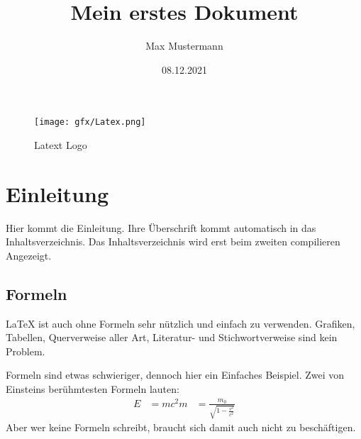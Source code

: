 \documentclass[a4paper,10pt]{scrartcl}
\title{Mein erstes Dokument}
\author{Max Mustermann}
\date{08.12.2021}
\begin{document}
\maketitle

\begin{figure}[h]
\begin{center}
\texttt{[image: gfx/Latex.png]}
\caption{Latext Logo}
\label{latex_logo}
\end{center}
\end{figure}

\tableofcontents


\section{Einleitung}
Hier kommt die Einleitung. Ihre Überschrift kommt automatisch in das Inhaltsverzeichnis. Das Inhaltsverzeichnis wird erst beim zweiten compilieren Angezeigt.

\subsection{Formeln}
\LaTeX{} ist auch ohne Formeln sehr nützlich und einfach zu verwenden. Grafiken, Tabellen, Querverweise aller Art, Literatur- und Stichwortverweise sind kein Problem.

Formeln sind etwas schwieriger, dennoch hier ein Einfaches Beispiel. Zwei von Einsteins berühmtesten Formeln lauten:
\begin{align}
E &= mc^2
m &= \frac{m_0}{\sqrt{1-\frac{v^2}{c^2}}}
\end{align}
Aber wer keine Formeln schreibt, braucht sich damit auch nicht zu beschäftigen.
\end{document}
